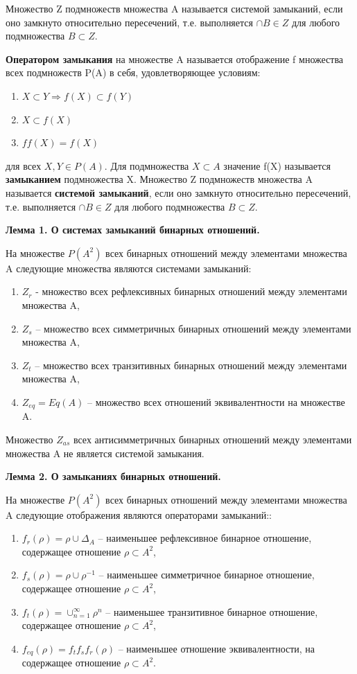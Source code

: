 \documentclass[spec, och, labwork]{shiza}
\begin{document}
Множество Z подмножеств множества A называется системой замыканий, если оно замкнуто относительно пересечений, т.е. 
выполняется $\cap B \in Z$ для любого подмножества $B \subset Z$.

\textbf{Оператором замыкания} на множестве A называется отображение f множества всех подмножеств P(A) в себя, удовлетворяющее условиям:
\begin{enumerate}
    \item $X \subset Y \Rightarrow f(X) \subset f(Y)$
    \item $X \subset f(X)$
    \item $ff(X) = f(X)$
\end{enumerate}

для всех $X,Y \in P(A)$. Для подмножества $X \subset A$ значение f(X) называется \textbf{замыканием} подмножества X.
Множество Z подмножеств множества A называется \textbf{системой замыканий}, если оно замкнуто относительно пересечений, т.е. выполняется
$\cap B \in Z$ для любого подмножества $B \subset Z$.

\textbf{Лемма 1. О системах замыканий бинарных отношений.} 

На множестве $P(A^2)$ всех бинарных отношений между элементами множества A следующие множества являются системами замыканий:

\begin{enumerate}
    \item $Z_r$ - множество всех рефлексивных бинарных отношений между элементами множества A,
    \item $Z_s$ – множество всех симметричных бинарных отношений между элементами множества A,
    \item $Z_t$ – множество всех транзитивных бинарных отношений между элементами множества A,
    \item $Z_{eq} = Eq(A)$ – множество всех отношений эквивалентности на множестве A.
    
\end{enumerate}

Множество $Z_{as}$ всех антисимметричных бинарных отношений между элементами множества A не является системой замыкания.

\textbf{Лемма 2. О замыканиях бинарных отношений.}

На множестве $P(A^2)$ всех бинарных отношений между элементами множества A следующие отображения являются операторами замыканий::

\begin{enumerate}
    \item $f_r (\rho)=\rho \cup \Delta_A$ – наименьшее рефлексивное бинарное отношение, содержащее отношение $\rho \subset A^2$,
    \item $f_s (\rho)= \rho \cup \rho^{-1}$ – наименьшее симметричное бинарное отношение, содержащее отношение $\rho \subset A^2$,
    \item $f_t (\rho)= \cup_{n=1}^\infty \rho^n$  – наименьшее транзитивное бинарное отношение, содержащее отношение $\rho \subset A^2$,
    \item $f_{eq} (\rho)=f_t f_s f_r (\rho)$ – наименьшее отношение эквивалентности, на содержащее отношение $\rho \subset A^2$.
    
\end{enumerate}
\end{document}
